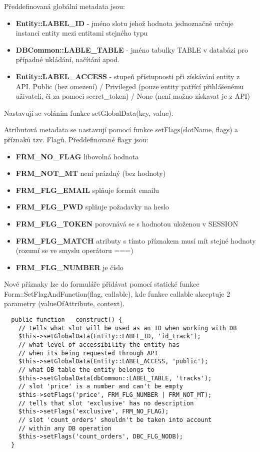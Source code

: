 \documentclass[12pt]{article}
\begin{document}
Předdefinovaná globální metadata jsou:

\begin{itemize}
\item \textbf{Entity::LABEL\_ID} - jméno slotu jehož hodnota jednoznačně určuje instanci entity mezi entitami stejného typu
\item \textbf{DBCommon::LABLE\_TABLE} - jméno tabulky TABLE v databázi pro případné ukládání, načítání apod.
\item \textbf{Entity::LABEL\_ACCESS} - stupeň přístupnosti při získávání entity z API. Public (bez omezení) / Privileged (pouze entity patřící přihlášenému uživateli, či za pomoci secret\_token) / None (není možno získavat je z API)
\end{itemize}

Nastavují se voláním funkce setGlobalData(key, value).

Atributová metadata se nastavují pomocí funkce setFlags(slotName, flags) a příznaků tzv. Flagů. Předdefinované flagy jsou:

\begin{itemize}
\item \textbf{FRM\_NO\_FLAG} libovolná hodnota
\item \textbf{FRM\_NOT\_MT} není prázdný (bez hodnoty)
\item \textbf{FRM\_FLG\_EMAIL} splňuje formát emailu
\item \textbf{FRM\_FLG\_PWD} splňuje požadavky na heslo
\item \textbf{FRM\_FLG\_TOKEN} porovnává se s hodnotou uloženou v SESSION
\item \textbf{FRM\_FLG\_MATCH} atributy s tímto příznakem musí mít stejné hodnoty (rozumí se ve smyslu operátoru ===)
\item \textbf{FRM\_FLG\_NUMBER} je číslo
\end{itemize}

Nové příznaky lze do formuláře přidávat pomocí statické funkce Form::SetFlagAndFunction(flag, callable), kde funkce callable akceptuje 2 parametry (valueOfAttribute, context).

\lstset{language=PHP}
\begin{lstlisting}
  public function __construct() {
    // tells what slot will be used as an ID when working with DB
    $this->setGlobalData(Entity::LABEL_ID, 'id_track');
    // what level of accessibility the entity has
    // when its being requested through API
    $this->setGlobalData(Entity::LABEL_ACCESS, 'public');
    // what DB table the entity belongs to
    $this->setGlobalData(dbCommon::LABEL_TABLE, 'tracks');
    // slot 'price' is a number and can't be empty
    $this->setFlags('price', FRM_FLG_NUMBER | FRM_NOT_MT);
    // tells that slot 'exclusive' has no description
    $this->setFlags('exclusive', FRM_NO_FLAG);
    // slot 'count_orders' shouldn't be taken into account
    // within any DB operation
    $this->setFlags('count_orders', DBC_FLG_NODB);
  }
\end{lstlisting}
\end{document}

